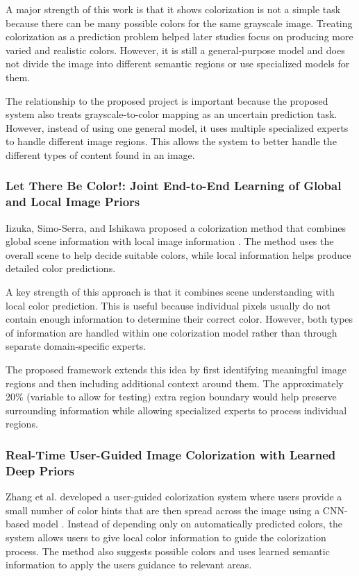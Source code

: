 \documentclass{FastFyp}
\begin{document}
A major strength of this work is that it shows colorization is not a simple task because there can be many possible colors for the same grayscale image. Treating colorization as a prediction problem helped later studies focus on producing more varied and realistic colors. However, it is still a general-purpose model and does not divide the image into different semantic regions or use specialized models for them.

The relationship to the proposed project is important because the proposed system also treats grayscale-to-color mapping as an uncertain prediction task. However, instead of using one general model, it uses multiple specialized experts to handle different image regions. This allows the system to better handle the different types of content found in an image.

\subsubsection{Let There Be Color!: Joint End-to-End Learning of Global and Local Image Priors}

Iizuka, Simo-Serra, and Ishikawa proposed a colorization method that combines global scene information with local image information \cite{ref2}. The method uses the overall scene to help decide suitable colors, while local information helps produce detailed color predictions.

A key strength of this approach is that it combines scene understanding with local color prediction. This is useful because individual pixels usually do not contain enough information to determine their correct color. However, both types of information are handled within one colorization model rather than through separate domain-specific experts.

The proposed framework extends this idea by first identifying meaningful image regions and then including additional context around them. The approximately 20\% (variable to allow for testing) extra region boundary would help preserve surrounding information while allowing specialized experts to process individual regions.

\subsubsection{Real-Time User-Guided Image Colorization with Learned Deep Priors}

Zhang et al. developed a user-guided colorization system where users provide a small number of color hints that are then spread across the image using a CNN-based model \cite{ref3}. Instead of depending only on automatically predicted colors, the system allows users to give local color information to guide the colorization process. The method also suggests possible colors and uses learned semantic information to apply the user\textquotesingle s guidance to relevant areas.
\end{document}

